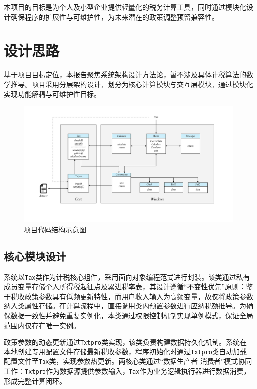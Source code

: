 \documentclass[a4paper, utf8]{ctexart}
\begin{document}
    本项目的目标是为个人及小型企业提供轻量化的税务计算工具，同时通过模块化设计确保程序的扩展性与可维护性，为未来潜在的政策调整预留兼容性。

    \section{设计思路}

    基于项目目标定位，本报告聚焦系统架构设计方法论，暂不涉及具体计税算法的数学推导。项目采用分层架构设计，划分为核心计算模块与交互层模块，通过模块化实现功能解耦与可维护性目标。

    \begin{figure}[htbp]
        \centering
        \includegraphics[width=\linewidth]{./figure/Structure.png}
        \caption{项目代码结构示意图}
    \end{figure}

    \subsection{核心模块设计}

    系统以\verb|Tax|类作为计税核心组件，采用面向对象编程范式进行封装。该类通过私有成员变量存储个人所得税起征点及累进税率表，其设计遵循“不变性优先”原则：鉴于税收政策参数具有低频更新特性，而用户收入输入为高频变量，故仅将政策参数纳入类属性存储。在计算流程中，直接调用类内预置参数进行应纳税额推导。为确保数据一致性并避免重复实例化，本类通过权限控制机制实现单例模式，保证全局范围内仅存在唯一实例。

    政策参数的动态更新通过\verb|Txtpro|类实现，该类负责构建数据持久化机制。系统在本地创建专用配置文件存储最新税收参数，程序初始化时通过\verb|Txtpro|类自动加载配置文件至\verb|Tax|类，实现参数热更新。两核心类通过“数据生产者-消费者”模式协同工作：\verb|Txtpro|作为数据源提供参数输入，\verb|Tax|作为业务逻辑执行器进行数据消费，形成完整计算闭环。
\end{document}
